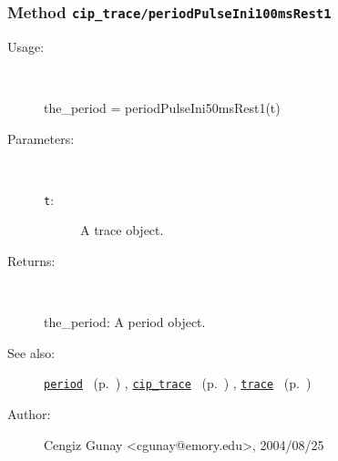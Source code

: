 \subsubsection[Method \texttt{periodPulseIni100msRest1}]{Method \texttt{cip\_trace/periodPulseIni100msRest1}}%
%
\label{ref_cip_trace__periodPulseIni100msRest1}%
\hypertarget{ref_cip_trace__periodPulseIni100msRest1}{}%
\begin{description}
%
\item[Usage:]~%
\begin{lyxcode}%
the\_period = periodPulseIni50msRest1(t)
%
\end{lyxcode}%
%
%
\item[Parameters:]~
\begin{description}%
\item[\texttt{t}:]
 A trace object.
\end{description}%
%
\item[Returns:]~

	the\_period: A period object.
%
%
\item[See also:]%
\hyperlink{ref_period}{\texttt{period}}%
\ (p.~\pageref{ref_period})%
%
, \hyperlink{ref_cip_trace}{\texttt{cip\_trace}}%
\ (p.~\pageref{ref_cip_trace})%
%
, \hyperlink{ref_trace}{\texttt{trace}}%
\ (p.~\pageref{ref_trace})%
%
%
\item[Author:]%
Cengiz Gunay <cgunay@emory.edu>, 2004/08/25%
\end{description}
\methodline%
